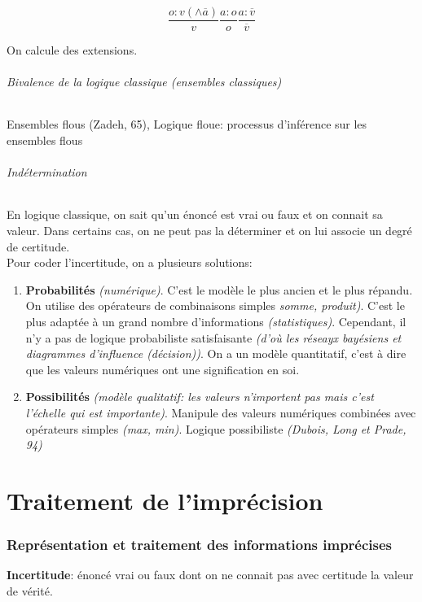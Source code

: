 \documentclass[a4paper,12pt]{article}
\begin{document}
	$$ \frac{o : v(\land \overline{a})}{v} \frac{a:o}{o} \frac{a: \overline{v}}{\overline{v}} $$
	
	On calcule des extensions.\\
	
	\paragraph{Bivalence de la logique classique (ensembles classiques)} Ensembles flous (Zadeh, 65), Logique floue: processus d'inférence sur les ensembles flous
	
	\paragraph{Indétermination} En logique classique, on sait qu'un énoncé est vrai ou faux et on connait sa valeur. Dans certains cas, on ne peut pas la déterminer et on lui associe un degré de certitude.\\
	
	Pour coder l'incertitude, on a plusieurs solutions:
	\begin{enumerate}
		\item \textbf{Probabilités} \emph{(numérique)}. C'est le modèle le plus ancien et le plus répandu. On utilise des opérateurs de combinaisons simples \emph{somme, produit)}. C'est le plus adaptée à un grand nombre d'informations \emph{(statistiques)}. Cependant, il n'y a pas de logique probabiliste satisfaisante \emph{(d'où les réseayx bayésiens et diagrammes d'influence \emph{(décision)})}. On a un modèle quantitatif, c'est à dire que les valeurs numériques ont une signification en soi.
		\item \textbf{Possibilités} \emph{(modèle qualitatif: les valeurs n'importent pas mais c'est l'échelle qui est importante)}. Manipule des valeurs numériques combinées avec opérateurs simples \emph{(max, min)}. Logique possibiliste \emph{(Dubois, Long et Prade, 94)}
	\end{enumerate}
	
	\part{Traitement de l'imprécision}
	\section{Représentation et traitement des informations imprécises}
	\textbf{Incertitude}: énoncé vrai ou faux dont on ne connait pas avec certitude la valeur de vérité.\\
	
\end{document}
